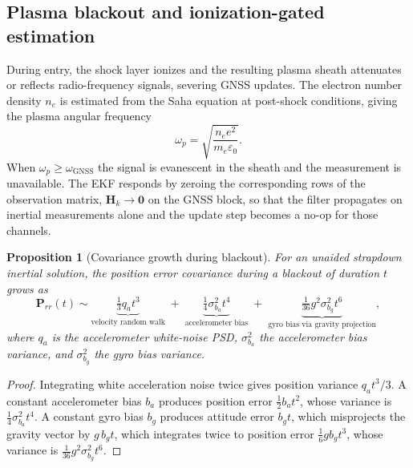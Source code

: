 \documentclass[11pt,a4paper]{article}
\newtheorem{proposition}[theorem]{Proposition}
\theoremstyle{definition}
\numberwithin{equation}{section}
\begin{document}
\subsection{Plasma blackout and ionization-gated estimation}
\label{sec:blackout}

During entry, the shock layer ionizes and the resulting plasma sheath attenuates or reflects radio-frequency signals, severing GNSS updates. The electron number density $n_e$ is estimated from the Saha equation at post-shock conditions, giving the plasma angular frequency
\begin{equation}
\label{eq:plasmafreq}
\omega_p = \sqrt{\frac{n_e e^2}{m_e \varepsilon_0}} .
\end{equation}
When $\omega_p \ge \omega_{\text{GNSS}}$ the signal is evanescent in the sheath and the measurement is unavailable. The EKF responds by zeroing the corresponding rows of the observation matrix, $\mathbf{H}_k \to \mathbf{0}$ on the GNSS block, so that the filter propagates on inertial measurements alone and the update step becomes a no-op for those channels.

\begin{proposition}[Covariance growth during blackout]
\label{prop:blackout}
For an unaided strapdown inertial solution, the position error covariance during a blackout of duration $t$ grows as
\begin{equation}
\label{eq:growth}
\mathbf{P}_{rr}(t) \sim \underbrace{\tfrac{1}{3} q_a t^3}_{\text{velocity random walk}}
\;+\; \underbrace{\tfrac{1}{4}\sigma_{b_a}^2 t^4}_{\text{accelerometer bias}}
\;+\; \underbrace{\tfrac{1}{36} g^2 \sigma_{b_g}^2 t^6}_{\text{gyro bias via gravity projection}},
\end{equation}
where $q_a$ is the accelerometer white-noise PSD, $\sigma_{b_a}^2$ the accelerometer bias variance, and $\sigma_{b_g}^2$ the gyro bias variance.
\end{proposition}

\begin{proof}
Integrating white acceleration noise twice gives position variance $q_a t^3/3$. A constant accelerometer bias $b_a$ produces position error $\tfrac{1}{2}b_a t^2$, whose variance is $\tfrac{1}{4}\sigma_{b_a}^2 t^4$. A constant gyro bias $b_g$ produces attitude error $b_g t$, which misprojects the gravity vector by $g\,b_g t$, which integrates twice to position error $\tfrac{1}{6}g b_g t^3$, whose variance is $\tfrac{1}{36}g^2\sigma_{b_g}^2 t^6$.
\end{proof}
\end{document}
